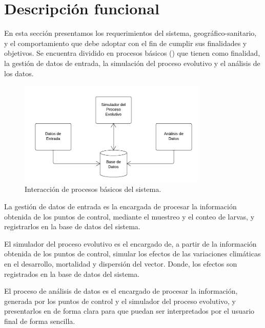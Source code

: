 \section{Descripción funcional}
En esta sección presentamos los requerimientos del sistema, geográfico-sanitario, y el
comportamiento que debe adoptar con el fin de cumplir sus finalidades y objetivos. Se encuentra
dividido en procesos básicos () que tienen como finalidad,
la gestión de datos de entrada, la simulación del proceso evolutivo y el análisis de los datos.

\begin{figure}
\centering
\includegraphics[width=0.8\textwidth]{capitulo-5/graphics/interaccion-modulos.png}
\caption{\label{fig:cap-5-interaccion-procesos}Interacción de procesos básicos del sistema.}
\end{figure}

La gestión de datos de entrada es la encargada de procesar la información obtenida de los puntos
de control, mediante el muestreo y el conteo de larvas, y registrarlos en la base de datos del
sistema.

El simulador del proceso evolutivo es el encargado de, a partir de la información obtenida de los
puntos de control, simular los efectos de las variaciones climáticas en el desarrollo, mortalidad
y dispersión del vector. Donde, los efectos son registrados en la base de datos del sistema.

El proceso de análisis de datos es el encargado de procesar la información, generada por los
puntos de control y el simulador del proceso evolutivo, y presentarlos en de forma clara para que
puedan ser interpretados por el usuario final de forma sencilla.




